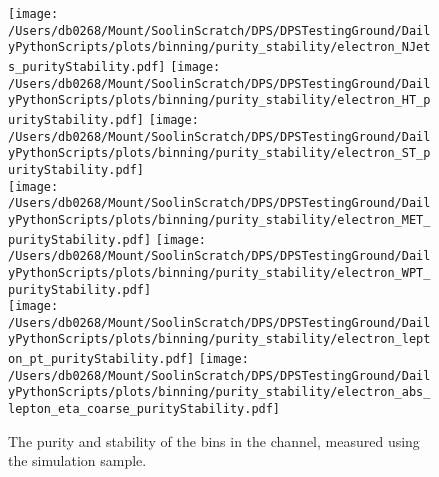 \begin{figure}[hp]
	\centering
	\texttt{[image: /Users/db0268/Mount/SoolinScratch/DPS/DPSTestingGround/DailyPythonScripts/plots/binning/purity\_stability/electron\_NJets\_purityStability.pdf]}
	\texttt{[image: /Users/db0268/Mount/SoolinScratch/DPS/DPSTestingGround/DailyPythonScripts/plots/binning/purity\_stability/electron\_HT\_purityStability.pdf]}
	\texttt{[image: /Users/db0268/Mount/SoolinScratch/DPS/DPSTestingGround/DailyPythonScripts/plots/binning/purity\_stability/electron\_ST\_purityStability.pdf]}\\
	\texttt{[image: /Users/db0268/Mount/SoolinScratch/DPS/DPSTestingGround/DailyPythonScripts/plots/binning/purity\_stability/electron\_MET\_purityStability.pdf]}
	\texttt{[image: /Users/db0268/Mount/SoolinScratch/DPS/DPSTestingGround/DailyPythonScripts/plots/binning/purity\_stability/electron\_WPT\_purityStability.pdf]} \\
	\texttt{[image: /Users/db0268/Mount/SoolinScratch/DPS/DPSTestingGround/DailyPythonScripts/plots/binning/purity\_stability/electron\_lepton\_pt\_purityStability.pdf]}
	\texttt{[image: /Users/db0268/Mount/SoolinScratch/DPS/DPSTestingGround/DailyPythonScripts/plots/binning/purity\_stability/electron\_abs\_lepton\_eta\_coarse\_purityStability.pdf]}
	\caption[The purity and stability of the bins in the \eJets{} channel, measured using the \powhegpythia{} simulation sample.]{The purity and stability of the bins in the \eJets{} channel, measured using the \powhegpythia{} simulation sample.}
	\label{fig:PurityStability1}
\end{figure}

